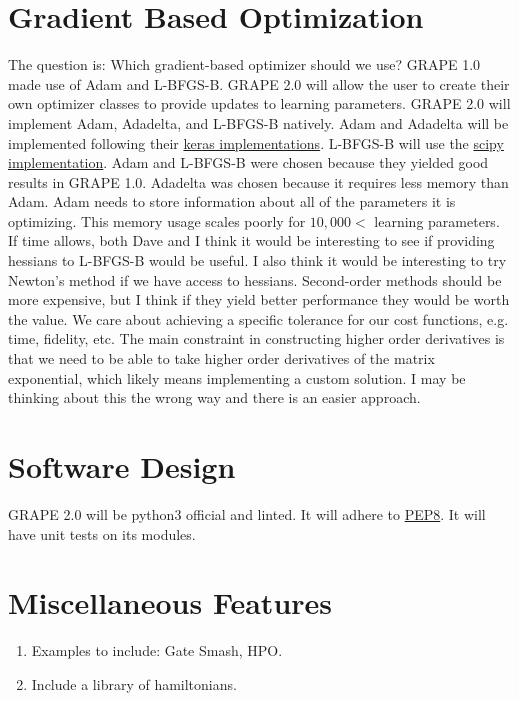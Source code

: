 \documentclass[letterpaper, 12pt]{article}
\begin{document}
\section{Gradient Based Optimization}
The question is: Which gradient-based optimizer should we use? GRAPE 1.0 made use of Adam and L-BFGS-B. GRAPE 2.0 will allow the user to create their own optimizer classes to provide updates to learning parameters. GRAPE 2.0 will implement Adam, Adadelta, and L-BFGS-B natively. Adam and Adadelta will be implemented following their \href{https://github.com/keras-team/keras/blob/master/keras/optimizers.py}{keras implementations}. L-BFGS-B will use the \href{https://docs.scipy.org/doc/scipy/reference/optimize.minimize-lbfgsb.html}{scipy implementation}. Adam and L-BFGS-B were chosen because they yielded good results in GRAPE 1.0. Adadelta was chosen because it requires less memory than Adam. Adam needs to store information about all of the parameters it is optimizing. This memory usage scales poorly for $10,000 <$ learning parameters. If time allows, both Dave and I think it would be interesting to see if providing hessians to L-BFGS-B would be useful. I also think it would be interesting to try Newton's method if we have access to hessians. Second-order methods should be more expensive, but I think if they yield better performance they would be worth the value. We care about achieving a specific tolerance for our cost functions, e.g. time, fidelity, etc. The main constraint in constructing higher order derivatives is that we need to be able to take higher order derivatives of the matrix exponential, which likely means implementing a custom solution. I may be thinking about this the wrong way and there is an easier approach.

\section{Software Design}
GRAPE 2.0 will be python3 official and linted. It will adhere to \href{https://www.python.org/dev/peps/pep-0008/}{PEP8}. It will have unit tests on its modules.

\section{Miscellaneous Features}
\begin{enumerate}
\item Examples to include: Gate Smash, HPO.
\item Include a library of hamiltonians.
\end{enumerate}




\end{document}
